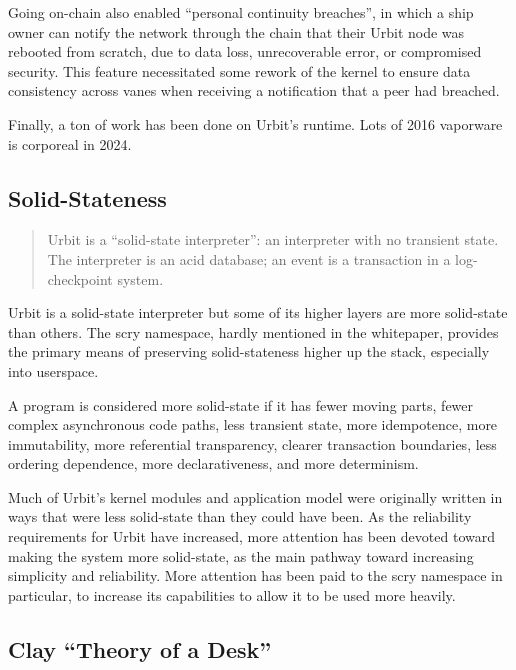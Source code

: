 \documentclass[twoside]{article}
\begin{document}
\sloppy
Going on-chain also enabled ``personal continuity breaches'', in which a ship owner can notify the network through the chain that their Urbit node was rebooted from scratch, due to data loss, unrecoverable error, or compromised security.  This feature necessitated some rework of the kernel to ensure data consistency across vanes when receiving a notification that a peer had breached.

Finally, a ton of work has been done on Urbit's runtime.  Lots of 2016 vaporware is corporeal in 2024.

\subsection{Solid-Stateness}

\begin{quote}
Urbit is a ``solid-state interpreter'': an interpreter with no
transient state.  The interpreter is an {\sc acid} database; an event
is a transaction in a log-checkpoint system.  \citep{Whitepaper}
\end{quote}

Urbit is a solid-state interpreter but some of its higher layers are more solid-state than others.  The scry namespace, hard\-ly mentioned in the whitepaper, provides the primary means of preserving solid-stateness higher up the stack, especially into userspace.

A program is considered more solid-state if it has fewer moving parts, fewer complex asynchronous code paths, less transient state, more idempotence, more immutability, more referential transparency, clearer transaction boundaries, less ordering dependence, more declarativeness, and more determinism.

Much of Urbit's kernel modules and application model were originally written in ways that were less solid-state than they could have been.  As the reliability requirements for Urbit have increased, more attention has been devoted toward making the system more solid-state, as the main pathway toward increasing simplicity and reliability.  More attention has been paid to the scry namespace in particular, to increase its capabilities to allow it to be used more heavily.

\subsection{Clay ``Theory of a Desk''}
\end{document}

